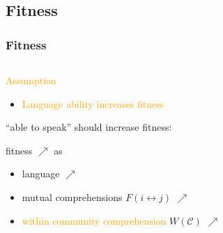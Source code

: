 \documentclass{beamer}
\newcommand{\hbEmph}[1]{\textcolor{orange}{#1}}
\newcommand{\hbSet}[1]{\mathcal{#1}}
\theoremstyle{plain}
\theoremstyle{definition}
\theoremstyle{remark}
\begin{document}
\subsection{Fitness}




\begin{frame}\frametitle{Fitness}
	
	\begin{columns}[T]
	\begin{column}{.8\linewidth}   

		\hbEmph{Assumption}
		\begin{itemize}
			\item 
			\hbEmph{Language ability increases fitness}
		\end{itemize}
		
		\vspace{1 cm}
		``able to speak'' should increase fitness:
		\vspace{0.5 cm}
		
		fitness $\nearrow$ as 
		\begin{itemize}
		
			\item
			language $\nearrow$
		
			\item
			mutual comprehensions 
				$F(i \leftrightarrow j)$
				$\nearrow$
		
			\item
			\hbEmph{within community comprehension} 
				$W(\hbSet{C})$
				$\nearrow$
		\end{itemize}

	\end{column}
	\begin{column}{.2\linewidth}


\end{column}
\end{columns}
\end{frame}
\end{document}
